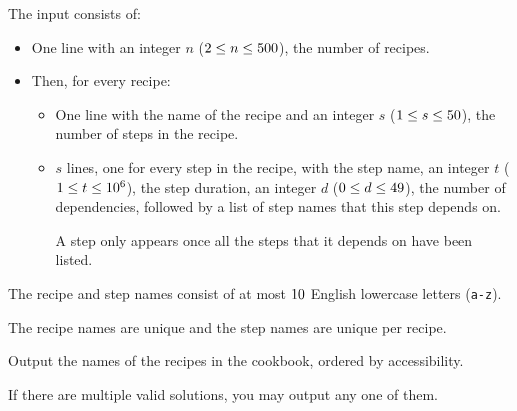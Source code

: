 \begin{Input}
    The input consists of:
    \begin{itemize}
        \item One line with an integer $n$ ($2\leq n\leq 500$), the number of recipes.
        \item Then, for every recipe:
        \begin{itemize}
            \item One line with the name of the recipe and
                an integer $s$ ($1\leq s\leq 50$), the number of steps in the recipe.
            \item $s$ lines, one for every step in the recipe, with
                the step name,
                an integer $t$ ($1\leq t\leq 10^6$), the step duration,
                an integer $d$ ($0\leq d\leq 49$), the number of dependencies,
                followed by a list of step names that this step depends on.

                A step only appears once all the steps that it depends on have been listed.
        \end{itemize}
    \end{itemize}
    The recipe and step names consist of at most $10$ English lowercase letters (\texttt{a-z}).

    The recipe names are unique and the step names are unique per recipe.
\end{Input}

\begin{Output}
    Output the names of the recipes in the cookbook, ordered by accessibility.

    If there are multiple valid solutions, you may output any one of them.
\end{Output}

\pagebreak%
